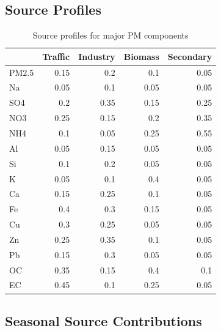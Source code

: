 \documentclass[
  letterpaper,
  oneside,
  openany]{MastersDoctoralThesis}
\begin{document}
\subsection{Source Profiles}\label{source-profiles}

\begin{longtable}[]{@{}lrrrr@{}}

\caption{\label{tbl-source-profiles}Source profiles for major PM
components}

\tabularnewline

\toprule\noalign{}
& Traffic & Industry & Biomass & Secondary \\
\midrule\noalign{}
\endhead
\bottomrule\noalign{}
\endlastfoot
PM2.5 & 0.15 & 0.2 & 0.1 & 0.05 \\
Na & 0.05 & 0.1 & 0.05 & 0.05 \\
SO4 & 0.2 & 0.35 & 0.15 & 0.25 \\
NO3 & 0.25 & 0.15 & 0.2 & 0.35 \\
NH4 & 0.1 & 0.05 & 0.25 & 0.55 \\
Al & 0.05 & 0.15 & 0.05 & 0.05 \\
Si & 0.1 & 0.2 & 0.05 & 0.05 \\
K & 0.05 & 0.1 & 0.4 & 0.05 \\
Ca & 0.15 & 0.25 & 0.1 & 0.05 \\
Fe & 0.4 & 0.3 & 0.15 & 0.05 \\
Cu & 0.3 & 0.25 & 0.05 & 0.05 \\
Zn & 0.25 & 0.35 & 0.1 & 0.05 \\
Pb & 0.15 & 0.3 & 0.05 & 0.05 \\
OC & 0.35 & 0.15 & 0.4 & 0.1 \\
EC & 0.45 & 0.1 & 0.25 & 0.05 \\

\end{longtable}

\subsection{Seasonal Source
Contributions}\label{seasonal-source-contributions}
\end{document}
